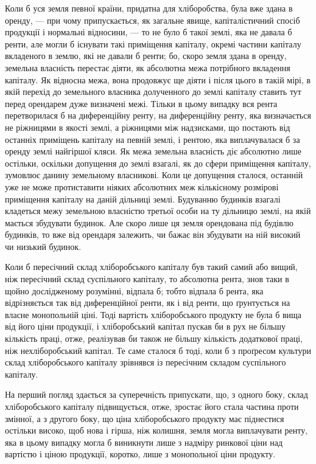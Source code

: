 Коли б уся земля певної країни, придатна для хліборобства, була вже
здана в оренду, — при чому припускається, як загальне явище, капіталістичний
спосіб продукції і нормальні відносини, — то не було б такої землі, яка не
давала б ренти, але могли б існувати такі приміщення капіталу, окремі частини
капіталу вкладеного в землю, які не давали б ренти; бо, скоро земля здана в
оренду, земельна власність перестає діяти, як абсолютна межа потрібного вкладення
капіталу. Як відносна межа, вона продовжує ще діяти і після цього
в такій мірі, в якій перехід до земельного власника долученного до землі капіталу
ставить тут перед орендарем дуже визначені межі. Тільки в цьому випадку
вся рента перетворилася б на диференційну ренту, на диференційну ренту, яка
визначається не ріжницями в якості землі, а ріжницями між надзисками, що
постають від останніх приміщень капіталу на певній землі, і рентою, яка виплачувалася
б за оренду землі найгіршої кляси. Як межа земельна власність
діє абсолютно лише остільки, оскільки допущення до землі взагалі, як до сфери
приміщення капіталу, зумовлює данину земельному власникові. Коли це допущення
сталося, останній уже не може протиставити ніяких абсолютних меж
кількісному розмірові приміщення капіталу на даній дільниці землі. Будуванню
будинків взагалі кладеться межу земельною власністю третьої особи на ту дільницю
землі, на якій мається збудувати будинок. Але скоро лише ця земля
орендована під будівлю будинків, то вже від орендаря залежить, чи бажає він
збудувати на ній високий чи низький будинок.

Коли б пересічний склад хліборобського капіталу був такий самий або
вищий, ніж пересічний склад суспільного капіталу, то абсолютна рента, знов
таки в щойно дослідженому розумінні, відпала б; тобто відпала б рента, яка
відрізняється так від диференційної ренти, як і від ренти, що ґрунтується на
власне монопольній ціні. Тоді вартість хліборобського продукту не була б
вища від його ціни продукції, і хліборобський капітал пускав би в рух не
більшу кількість праці, отже, реалізував би також не більшу кількість додаткової
праці, ніж нехліборобський капітал. Те саме сталося б тоді, коли б з
проґресом культури склад хліборобського капіталу зрівнявся із пересічним
складом суспільного капіталу.

На перший погляд здається за суперечність припускати, що, з одного
боку, склад хліборобського капіталу підвищується, отже, зростає його стала частина
проти змінної, а з другого боку, що ціна хліборобського продукту має
піднестися остільки високо, щоб нова і гірша, ніж колишня, земля могла виплачувати
ренту, яка в цьому випадку могла б виникнути лише з надміру ринкової
ціни над вартістю і ціною продукції, коротко, лише з монопольної ціни
продукту.

